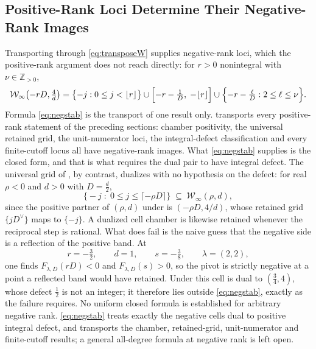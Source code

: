 \documentclass[11pt,letterpaper]{article}
\newcommand{\Zint}{\mathbb{Z}}
\begin{document}
\subsection{Positive-Rank Loci Determine Their Negative-Rank Images}
Transporting  through \eqref{eq:transposeW} supplies
negative-rank loci, which the positive-rank argument does not reach directly: for $r>0$ nonintegral with $\nu\in\Zint_{>0}$,
\begin{equation}
  \mathcal{W}_\infty\!\left(-rD,\tfrac4d\right)
  =\bigl\{-j:0\le j<\lfloor r\rfloor\bigr\}
  \cup\Bigl[-r-\tfrac1D,\;-\lfloor r\rfloor\Bigr]
  \cup\Bigl\{-r-\tfrac{\ell}{D}:2\le\ell\le\nu\Bigr\}.
  \label{eq:negstab}
\end{equation}
Formula \eqref{eq:negstab} is the transport of one result only.
 transports every positive-rank statement of the preceding
sections: chamber positivity, the universal retained grid, the unit-numerator
loci, the integral-defect classification and every finite-cutoff locus all have
negative-rank images. What \eqref{eq:negstab} supplies is the closed form, and
that is what requires the dual pair to have integral defect. The universal grid
of , by contrast, dualizes with no hypothesis on the defect: for
real $\rho<0$ and $d>0$ with $D=\tfrac{d}{2}$,
\begin{equation}
  \bigl\{-j\;:\;0\le j\le\lceil-\rho D\rceil\bigr\}
  \;\subseteq\;\mathcal{W}_\infty(\rho,d),
  \label{eq:neggrid}
\end{equation}
since the positive partner of $(\rho,d)$ under  is
$(-\rho D,4/d)$, whose retained grid $\{jD^{\vee}\}$ maps to $\{-j\}$. A
dualized cell chamber is likewise retained whenever the reciprocal step is
rational. What does fail is the naive guess that the negative side is a
reflection of the positive band. At
\begin{equation}
  r=-\tfrac32,\qquad d=1,\qquad s=-\tfrac38,\qquad \lambda=(2,2),
  \label{eq:negwitness}
\end{equation}
one finds $F_{\lambda,D}(rD)<0$ and $F_{\lambda,D}(s)>0$, so the pivot is
strictly negative at a point a reflected band would have retained. Under
 this cell is dual to $(\tfrac34,4)$, whose defect
$\tfrac12$ is not an integer; it therefore lies outside \eqref{eq:negstab},
exactly as the failure requires.
No uniform closed formula is established for arbitrary negative rank.
\eqref{eq:negstab} treats exactly the negative cells dual to positive integral
defect, and  transports the chamber, retained-grid,
unit-numerator and finite-cutoff results; a general all-degree formula at
negative rank is left open.
\end{document}
